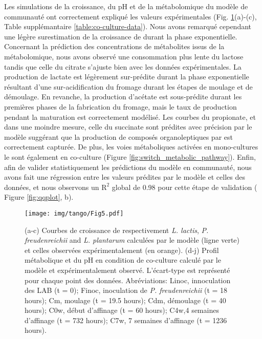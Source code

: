 Les simulations de la croissance, du pH et de la métabolomique du modèle de communauté ont correctement expliqué les valeurs expérimentales (Fig. \ref{dfba_community}(a)-(c), Table supplémantaire \ref{table:co-culture-data}). Nous avons remarqué cependant une légère surestimation de la croissance de \freud durant la phase exponentielle. Concernant la prédiction des concentrations de métabolites issus de la métabolomique, nous avons observé une consommation plus lente du lactose tandis que celle du citrate s'ajuste bien avec les données expérimentales. La production de lactate est légèrement sur-prédite durant la phase exponentielle résultant d'une sur-acidification du fromage durant les étapes de moulage et de démoulage. En revanche, la production d'acétate est sous-prédite durant les premières phases de la fabrication du fromage, mais le taux de production pendant la maturation est correctement modélisé. Les courbes du propionate, et dans une moindre mesure, celle du succinate sont prédites avec précision par le modèle suggérant que la production de composés organoleptiques par \freud est correctement capturée. De plus, les voies métaboliques activées en mono-cultures le sont également en co-culture (Figure \ref{fig:switch_metabolic_pathway}). Enfin, afin de valider statistiquement les prédictions du modèle en communauté, nous avons fait une régression entre les valeurs prédites par le modèle et celles des données, et nous observons un $\text{R}^2$ global de 0.98 pour cette étape de validation ( Figure \ref{fig:qqplot}, b). 

\begin{figure}[H]
    \centering
    \texttt{[image: img/tango/Fig5.pdf]}
    \caption{(a-c) Courbes de croissance de respectivement  \textit{L. lactis}, \textit{P. freudenreichii} and \textit{L. plantarum} calculées par le modèle (ligne verte) et celles observées expérimentalement (en orange). (d-j) Profil métabolique et du pH en condition de co-culture calculé par le modèle et expérimentalement observé. L'écart-type est représenté pour chaque point des données.  Abréviations: Linoc, innoculation des LAB (t = 0); Finoc, inoculation de \textit{P. freudenreichii}  (t = 18 hours); Cm, moulage (t = 19.5 hours); Cdm, démoulage (t = 40 hours); C0w, début d'affinage (t = 60 hours); C4w,4 semaines d'affinage (t = 732 hours); C7w, 7 semaines d'affinage (t = 1236 hours).}
    \label{dfba_community}
\end{figure}

